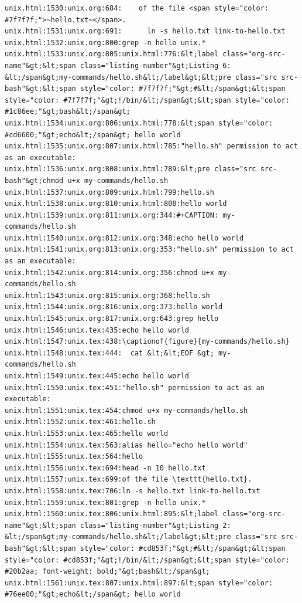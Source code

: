 \documentclass[11pt]{article}
\begin{document}
\begin{verbatim}
unix.html:1530:unix.org:684:    of the file <span style="color: #7f7f7f;">~hello.txt~</span>.
unix.html:1531:unix.org:691:      ln -s hello.txt link-to-hello.txt
unix.html:1532:unix.org:800:grep -n hello unix.*
unix.html:1533:unix.org:805:unix.html:776:&lt;label class="org-src-name"&gt;&lt;span class="listing-number"&gt;Listing 6: &lt;/span&gt;my-commands/hello.sh&lt;/label&gt;&lt;pre class="src src-bash"&gt;&lt;span style="color: #7f7f7f;"&gt;#&lt;/span&gt;&lt;span style="color: #7f7f7f;"&gt;!/bin/&lt;/span&gt;&lt;span style="color: #1c86ee;"&gt;bash&lt;/span&gt;
unix.html:1534:unix.org:806:unix.html:778:&lt;span style="color: #cd6600;"&gt;echo&lt;/span&gt; hello world
unix.html:1535:unix.org:807:unix.html:785:"hello.sh" permission to act as an executable:
unix.html:1536:unix.org:808:unix.html:789:&lt;pre class="src src-bash"&gt;chmod u+x my-commands/hello.sh
unix.html:1537:unix.org:809:unix.html:799:hello.sh
unix.html:1538:unix.org:810:unix.html:808:hello world
unix.html:1539:unix.org:811:unix.org:344:#+CAPTION: my-commands/hello.sh
unix.html:1540:unix.org:812:unix.org:348:echo hello world
unix.html:1541:unix.org:813:unix.org:353:"hello.sh" permission to act as an executable:
unix.html:1542:unix.org:814:unix.org:356:chmod u+x my-commands/hello.sh
unix.html:1543:unix.org:815:unix.org:368:hello.sh
unix.html:1544:unix.org:816:unix.org:373:hello world
unix.html:1545:unix.org:817:unix.org:643:grep hello 
unix.html:1546:unix.tex:435:echo hello world
unix.html:1547:unix.tex:438:\captionof{figure}{my-commands/hello.sh}
unix.html:1548:unix.tex:444:  cat &lt;&lt;EOF &gt; my-commands/hello.sh
unix.html:1549:unix.tex:445:echo hello world
unix.html:1550:unix.tex:451:"hello.sh" permission to act as an executable:
unix.html:1551:unix.tex:454:chmod u+x my-commands/hello.sh
unix.html:1552:unix.tex:461:hello.sh
unix.html:1553:unix.tex:465:hello world
unix.html:1554:unix.tex:563:alias hello="echo hello world"
unix.html:1555:unix.tex:564:hello
unix.html:1556:unix.tex:694:head -n 10 hello.txt
unix.html:1557:unix.tex:699:of the file \texttt{hello.txt}.
unix.html:1558:unix.tex:706:ln -s hello.txt link-to-hello.txt
unix.html:1559:unix.tex:801:grep -n hello unix.*
unix.html:1560:unix.tex:806:unix.html:895:&lt;label class="org-src-name"&gt;&lt;span class="listing-number"&gt;Listing 2: &lt;/span&gt;my-commands/hello.sh&lt;/label&gt;&lt;pre class="src src-bash"&gt;&lt;span style="color: #cd853f;"&gt;#&lt;/span&gt;&lt;span style="color: #cd853f;"&gt;!/bin/&lt;/span&gt;&lt;span style="color: #20b2aa; font-weight: bold;"&gt;bash&lt;/span&gt;
unix.html:1561:unix.tex:807:unix.html:897:&lt;span style="color: #76ee00;"&gt;echo&lt;/span&gt; hello world

\end{verbatim}
\end{document}
